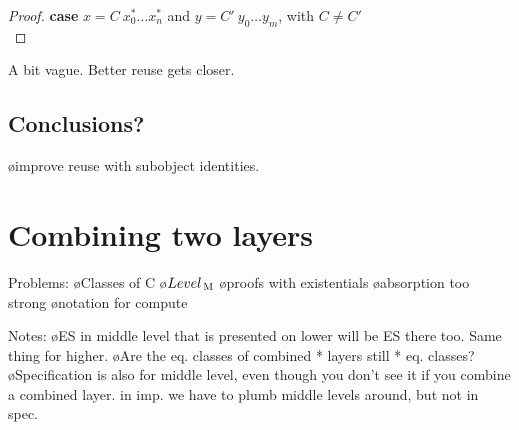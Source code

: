 \begin{proof}
{\bf case} $x = C~x^*_0 \dots x^*_n$ and $y = C'~y_0 \dots y_m$, with $C \neq C'$\\
\end{proof}


A bit vague. Better reuse gets closer.

\subsection{Conclusions?}

\bl
\o improve reuse with subobject identities.
\el










%																
%																
%																
\section{Combining two layers}  \label{sect:combinedExtra}


Problems:
\bl
\o Classes of C
\o $Level_{\, \mathrm M}$
\o proofs with existentials
\o absorption too strong
\o notation for compute
\el

Notes:
\bl
\o ES in middle level that is presented on lower will be ES there too. Same thing for higher.
\o Are the eq. classes of combined * layers still * eq. classes?
\o Specification is also for middle level, even though you don't see it if you combine a  combined layer. in imp. we have to plumb middle levels around, but not in spec.
\el


